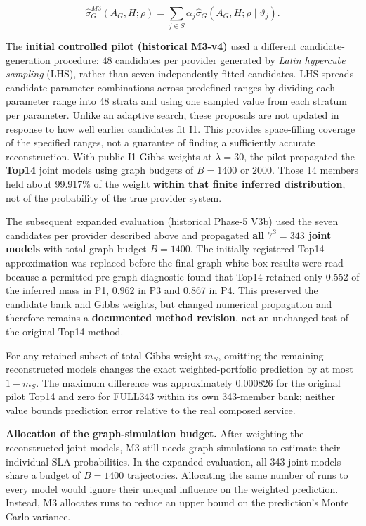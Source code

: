 \documentclass[10pt,a4paper]{article}
\begin{document}
\begin{equation*}
\widehat\sigma_G^{M3}(A_G,H;\rho)
=\sum_{j\in S}\alpha_j
\widehat\sigma_G(A_G,H;\rho\mid\vartheta_j).
\tag{14}
\end{equation*}

The \textbf{initial controlled pilot (historical M3-v4)} used a different candidate-generation procedure: 48 candidates per provider generated by \emph{Latin hypercube sampling} (LHS), rather than seven independently fitted candidates. LHS spreads candidate parameter combinations across predefined ranges by dividing each parameter range into 48 strata and using one sampled value from each stratum per parameter. Unlike an adaptive search, these proposals are not updated in response to how well earlier candidates fit I1. This provides space-filling coverage of the specified ranges, not a guarantee of finding a sufficiently accurate reconstruction. With public-I1 Gibbs weights at $\lambda=30$, the pilot propagated the \textbf{Top14} joint models using graph budgets of $B=1400$ or $2000$. Those 14 members held about 99.917\% of the weight \textbf{within that finite inferred distribution}, not of the probability of the true provider system.

The subsequent expanded evaluation (historical \hyperref[app:experiment-stages]{Phase-5 V3b}) used the seven candidates per provider described above and propagated \textbf{all $7^3=343$ joint models} with total graph budget $B=1400$. The initially registered Top14 approximation was replaced before the final graph white-box results were read because a permitted pre-graph diagnostic found that Top14 retained only 0.552 of the inferred mass in P1, 0.962 in P3 and 0.867 in P4. This preserved the candidate bank and Gibbs weights, but changed numerical propagation and therefore remains a \textbf{documented method revision}, not an unchanged test of the original Top14 method.

For any retained subset of total Gibbs weight $m_S$, omitting the remaining reconstructed models changes the exact weighted-portfolio prediction by at most $1-m_S$. The maximum difference was approximately 0.000826 for the original pilot Top14 and zero for FULL343 within its own 343-member bank; neither value bounds prediction error relative to the real composed service.

\textbf{Allocation of the graph-simulation budget.} After weighting the reconstructed joint models, M3 still needs graph simulations to estimate their individual SLA probabilities. In the expanded evaluation, all 343 joint models share a budget of $B=1400$ trajectories. Allocating the same number of runs to every model would ignore their unequal influence on the weighted prediction. Instead, M3 allocates runs to reduce an upper bound on the prediction's Monte Carlo variance.
\end{document}
